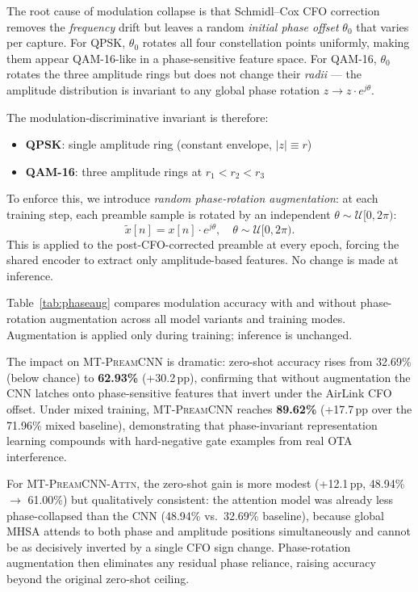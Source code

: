 \documentclass[conference]{IEEEtran}
\newcommand{\mtcnn}{\textsc{MT-PreamCNN}}
\newcommand{\mtcnnattn}{\textsc{MT-PreamCNN-Attn}}
\begin{document}
The root cause of modulation collapse is that Schmidl--Cox CFO correction
removes the \emph{frequency} drift but leaves a random \emph{initial phase
offset} $\theta_0$ that varies per capture.
For QPSK, $\theta_0$ rotates all four constellation points uniformly,
making them appear QAM-16-like in a phase-sensitive feature space.
For QAM-16, $\theta_0$ rotates the three amplitude rings but does not
change their \emph{radii} — the amplitude distribution is invariant to
any global phase rotation $z \to z \cdot e^{j\theta}$.

The modulation-discriminative invariant is therefore:
\begin{itemize}
  \item \textbf{QPSK}: single amplitude ring (constant envelope, $|z| \equiv r$)
  \item \textbf{QAM-16}: three amplitude rings at $r_1 < r_2 < r_3$
\end{itemize}
\noindent To enforce this, we introduce \emph{random phase-rotation augmentation}:
at each training step, each preamble sample is rotated by an independent
$\theta \sim \mathcal{U}[0, 2\pi)$:
\begin{equation}
  \tilde{x}[n] = x[n] \cdot e^{j\theta}, \quad \theta \sim \mathcal{U}[0, 2\pi).
  \label{eq:phaseaug}
\end{equation}
This is applied to the post-CFO-corrected preamble at every epoch,
forcing the shared encoder to extract only amplitude-based features.
No change is made at inference.

Table~\ref{tab:phaseaug} compares modulation accuracy with and without
phase-rotation augmentation across all model variants and training modes.
Augmentation is applied only during training; inference is unchanged.

The impact on \mtcnn{} is dramatic:
zero-shot accuracy rises from 32.69\% (below chance) to \textbf{62.93\%}
(+30.2\,pp), confirming that without augmentation the CNN latches onto
phase-sensitive features that invert under the AirLink CFO offset.
Under mixed training, \mtcnn{} reaches \textbf{89.62\%}
(+17.7\,pp over the 71.96\% mixed baseline),
demonstrating that phase-invariant representation learning
compounds with hard-negative gate examples from real OTA interference.

For \mtcnnattn{}, the zero-shot gain is more modest (+12.1\,pp, 48.94\%
$\to$ 61.00\%) but qualitatively consistent: the attention model was
already less phase-collapsed than the CNN (48.94\% vs.\ 32.69\% baseline),
because global MHSA attends to both phase and amplitude positions
simultaneously and cannot be as decisively inverted by a single CFO sign
change.
Phase-rotation augmentation then eliminates any residual phase reliance,
raising accuracy beyond the original zero-shot ceiling.
\end{document}
